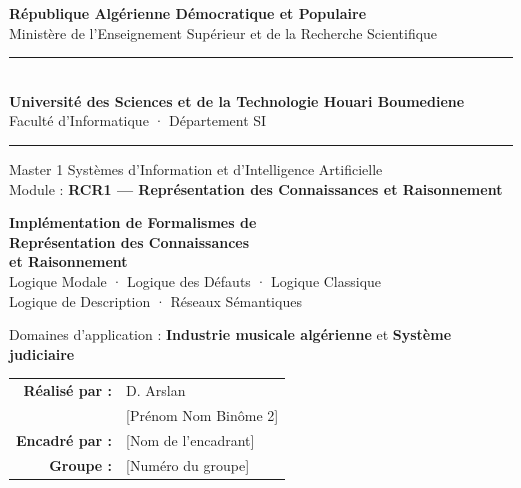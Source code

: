 \documentclass[11pt, a4paper]{article}
\begin{document}
\begin{titlepage}
\begin{center}

{\large\bfseries République Algérienne Démocratique et Populaire}\\[0.3em]
{\large Ministère de l'Enseignement Supérieur et de la Recherche Scientifique}\\[1.5em]

\rule{\linewidth}{0.6pt}\\[0.5em]
{\large\bfseries Université des Sciences et de la Technologie Houari Boumediene}\\
{\normalsize Faculté d'Informatique · Département SI}\\[0.3em]
\rule{\linewidth}{0.6pt}

\vspace{2em}

{\color{usthbblue}\large Master 1 Systèmes d'Information et d'Intelligence Artificielle}\\[0.5em]
{\normalsize Module : \textbf{RCR1 --- Représentation des Connaissances et Raisonnement}}

\vspace{3em}

\begin{tcolorbox}[defbox, width=0.92\linewidth, halign=center]
  {\LARGE\bfseries Implémentation de Formalismes de}\\[0.4em]
  {\LARGE\bfseries Représentation des Connaissances}\\[0.4em]
  {\LARGE\bfseries et Raisonnement}\\[1em]
  {\large Logique Modale · Logique des Défauts · Logique Classique}\\
  {\large Logique de Description · Réseaux Sémantiques}
\end{tcolorbox}

\vspace{3em}

{\normalsize Domaines d'application :
  \textbf{Industrie musicale algérienne} et \textbf{Système judiciaire}}

\vspace{3em}

\begin{tabular}{rl}
  \textbf{Réalisé par :} & D. Arslan \\
                          & [Prénom Nom Binôme 2] \\[1em]
  \textbf{Encadré par :} & [Nom de l'encadrant] \\[1em]
  \textbf{Groupe :}      & [Numéro du groupe]
\end{tabular}


\end{center}
\end{titlepage}
\end{document}
